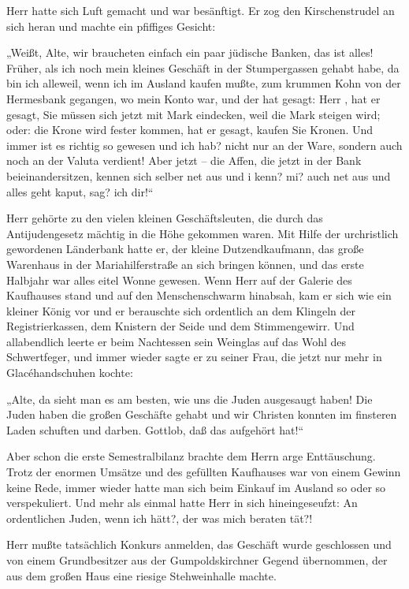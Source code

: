 Herr \Zwickerl{} hatte sich Luft gemacht und war
besänftigt. Er zog den Kirschenstrudel an sich heran und machte ein
pfiffiges Gesicht:

„Weißt, Alte, wir braucheten einfach ein paar jüdische Banken, das
ist alles! Früher, als ich noch mein kleines Geschäft in der
Stumpergassen gehabt habe, da bin ich alleweil, wenn ich im Ausland
kaufen mußte, zum krummen Kohn von der Hermesbank gegangen, wo mein
Konto war, und der hat gesagt: Herr \Zwickerl{}, hat er gesagt, Sie
müssen sich jetzt mit Mark eindecken, weil die Mark steigen wird;
oder: die Krone wird fester kommen, hat er gesagt, kaufen Sie
Kronen. Und immer ist es richtig so gewesen und ich hab? nicht nur
an der Ware, sondern auch noch an der Valuta verdient! Aber jetzt –
die Affen, die jetzt in der Bank beieinandersitzen, kennen sich
selber net aus und i kenn? mi? auch net aus und alles geht kaput,
sag? ich dir!“

Herr \Zwickerl{} gehörte zu den vielen kleinen Geschäftsleuten, die
durch das Antijudengesetz mächtig in die Höhe gekommen waren. Mit
Hilfe der urchristlich gewordenen Länderbank hatte er, der kleine
Dutzendkaufmann, das große Warenhaus in der Mariahilferstraße an
sich bringen können, und das erste Halbjahr war alles eitel Wonne
gewesen. Wenn Herr \Zwickerl{} auf der Galerie des Kaufhauses stand
und auf den Menschenschwarm hinabsah, kam er sich wie ein kleiner
König vor und er berauschte sich ordentlich an dem Klingeln der
Registrierkassen, dem Knistern der Seide und dem Stimmengewirr. Und
allabendlich leerte er beim Nachtessen sein Weinglas auf das
 Wohl des Schwertfeger, und immer wieder sagte er zu
seiner Frau, die jetzt nur mehr in Glacéhandschuhen kochte:

„Alte, da sieht man es am besten, wie uns die Juden ausgesaugt
haben! Die Juden haben die großen Geschäfte gehabt und wir Christen
konnten im finsteren Laden schuften und darben. Gottlob, daß das
aufgehört hat!“

Aber schon die erste Semestralbilanz brachte dem Herrn \Zwickerl{}
arge Enttäuschung. Trotz der enormen Umsätze und des gefüllten
Kaufhauses war von einem Gewinn keine Rede, immer wieder hatte man
sich beim Einkauf im Ausland so oder so verspekuliert. Und mehr als
einmal hatte Herr \Zwickerl{} in sich hineingeseufzt: An ordentlichen
Juden, wenn ich hätt?, der was mich beraten tät?!

Herr \Zwickerl{} mußte tatsächlich Konkurs anmelden, das Geschäft
wurde geschlossen und von einem Grundbesitzer aus der
Gumpoldskirchner Gegend übernommen, der aus dem großen Haus eine
riesige Stehweinhalle machte.

